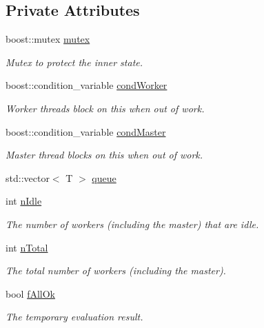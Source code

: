 \subsection*{Private Attributes}
\begin{DoxyCompactItemize}
\item 
boost\+::mutex \mbox{\hyperlink{class_c_check_queue_ae5f85fa9477f4b235186caed13fdb0bd}{mutex}}
\begin{DoxyCompactList}\small\item\em Mutex to protect the inner state. \end{DoxyCompactList}\item 
boost\+::condition\+\_\+variable \mbox{\hyperlink{class_c_check_queue_ac13d399e7ba30792618978ef5cc35aaf}{cond\+Worker}}
\begin{DoxyCompactList}\small\item\em Worker threads block on this when out of work. \end{DoxyCompactList}\item 
boost\+::condition\+\_\+variable \mbox{\hyperlink{class_c_check_queue_aa0227186df5be5eaa7d1477a8c8b7f1f}{cond\+Master}}
\begin{DoxyCompactList}\small\item\em Master thread blocks on this when out of work. \end{DoxyCompactList}\item 
std\+::vector$<$ T $>$ \mbox{\hyperlink{class_c_check_queue_a378dfa046218f16efbb9ac6974346db5}{queue}}
\item 
int \mbox{\hyperlink{class_c_check_queue_a1fe215c60f972ee5e69501d8d1acbe0d}{n\+Idle}}
\begin{DoxyCompactList}\small\item\em The number of workers (including the master) that are idle. \end{DoxyCompactList}\item 
int \mbox{\hyperlink{class_c_check_queue_ab1bc74ce62477926a24bd4dd03ea5c39}{n\+Total}}
\begin{DoxyCompactList}\small\item\em The total number of workers (including the master). \end{DoxyCompactList}\item 
bool \mbox{\hyperlink{class_c_check_queue_a0f8ef0bce2f6c6ee71c85215a90ed41e}{f\+All\+Ok}}
\begin{DoxyCompactList}\small\item\em The temporary evaluation result. \end{DoxyCompactList}\item 

\end{DoxyCompactItemize}
